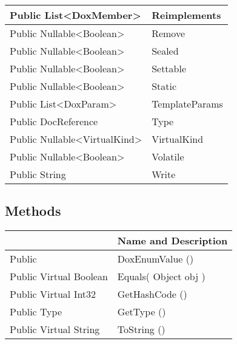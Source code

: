 \documentclass[11pt, oneside, a4paper]{book}
\begin{document}
\begin{center}
\begin{tabular}{| p{3cm} | p{12cm} | }
\hline
 Public  List<DoxMember> &  Reimplements\hypertarget{SoftwareEngineeringTools.{}Documentation.{}DoxEnumValue.{}Reimplements}{}\\
\hline
 Public  Nullable<Boolean> &  Remove\hypertarget{SoftwareEngineeringTools.{}Documentation.{}DoxEnumValue.{}Remove}{}\\
\hline
 Public  Nullable<Boolean> &  Sealed\hypertarget{SoftwareEngineeringTools.{}Documentation.{}DoxEnumValue.{}Sealed}{}\\
\hline
 Public  Nullable<Boolean> &  Settable\hypertarget{SoftwareEngineeringTools.{}Documentation.{}DoxEnumValue.{}Settable}{}\\
\hline
 Public  Nullable<Boolean> &  Static\hypertarget{SoftwareEngineeringTools.{}Documentation.{}DoxEnumValue.{}Static}{}\\
\hline
 Public  List<DoxParam> &  TemplateParams\hypertarget{SoftwareEngineeringTools.{}Documentation.{}DoxEnumValue.{}TemplateParams}{}\\
\hline
 Public  DocReference &  Type\hypertarget{SoftwareEngineeringTools.{}Documentation.{}DoxEnumValue.{}Type}{}\\
\hline
 Public  Nullable<VirtualKind> &  VirtualKind\hypertarget{SoftwareEngineeringTools.{}Documentation.{}DoxEnumValue.{}VirtualKind}{}\\
\hline
 Public  Nullable<Boolean> &  Volatile\hypertarget{SoftwareEngineeringTools.{}Documentation.{}DoxEnumValue.{}Volatile}{}\\
\hline
 Public  String &  Write\hypertarget{SoftwareEngineeringTools.{}Documentation.{}DoxEnumValue.{}Write}{}\\
\hline
\end{tabular}
\end{center}

\subsection{Methods}
\begin{center}
\begin{tabular}{| p{3cm} | p{12cm} | }
\hline
\textbf{ } & \textbf{ Name and Description}\\
\hline
 Public  &  DoxEnumValue ()\hypertarget{SoftwareEngineeringTools.{}Documentation.{}DoxEnumValue.{}DoxEnumValue}{}\\
\hline
 Public  Virtual  Boolean &  Equals(\hypertarget{SoftwareEngineeringTools.{}Documentation.{}DoxEnumValue.{}Equals\_Object}{} Object  obj  )\\
\hline
 Public  Virtual  Int32 &  GetHashCode ()\hypertarget{SoftwareEngineeringTools.{}Documentation.{}DoxEnumValue.{}GetHashCode}{}\\
\hline
 Public  Type &  GetType ()\hypertarget{SoftwareEngineeringTools.{}Documentation.{}DoxEnumValue.{}GetType}{}\\
\hline
 Public  Virtual  String &  ToString ()\hypertarget{SoftwareEngineeringTools.{}Documentation.{}DoxEnumValue.{}ToString}{}\\
\hline
\end{tabular}
\end{center}
 
\end{document}
